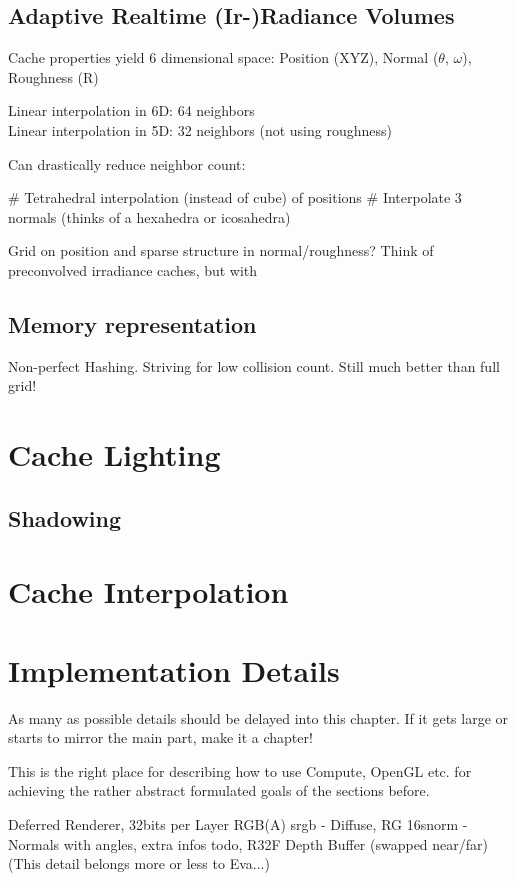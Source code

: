 \documentclass[thesis.tex]{subfiles}
\begin{document}
\subsection{Adaptive Realtime (Ir-)Radiance Volumes}
Cache properties yield 6 dimensional space: Position (XYZ), Normal ($\theta$, $\omega$), Roughness (R)

Linear interpolation in 6D: 64 neighbors\\
Linear interpolation in 5D: 32 neighbors (not using roughness)

Can drastically reduce neighbor count:
\begin{easylist}
# Tetrahedral interpolation (instead of cube) of positions
# Interpolate 3 normals (thinks of a hexahedra or icosahedra)
\end{easylist}

Grid on position and sparse structure in normal/roughness? Think of preconvolved irradiance caches, but with 

\subsection{Memory representation}
Non-perfect Hashing. Striving for low collision count.
Still much better than full grid!

\section{Cache Lighting}

\subsection{Shadowing}

\section{Cache Interpolation}



\section{Implementation Details}

As many as possible details should be delayed into this chapter. If it gets large or starts to mirror the main part, make it a chapter!

This is the right place for describing how to use Compute, OpenGL etc. for achieving the rather abstract formulated goals of the sections before.

Deferred Renderer, 32bits per Layer RGB(A) srgb - Diffuse, RG 16snorm - Normals with angles, extra infos todo, R32F Depth Buffer (swapped near/far)\\
(This detail belongs more or less to Eva...)

\subfilebib %
\end{document}
